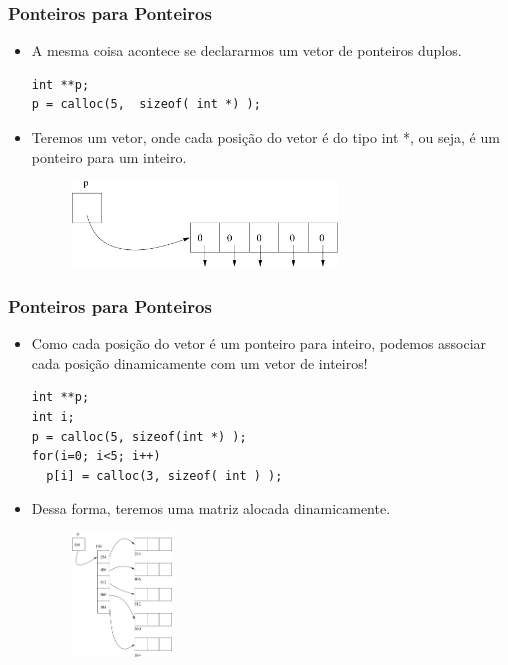 \documentclass[aspectratio=169]{beamer}
\begin{document}

\begin{frame}[fragile]
\frametitle{Ponteiros para Ponteiros}
\begin{itemize}
\item A mesma coisa acontece se declararmos um vetor de ponteiros duplos.
\begin{lstlisting}
int **p;
p = calloc(5,  sizeof( int *) );
\end{lstlisting}
\item Teremos um vetor, onde cada posição do vetor é do tipo int *, ou seja, é um ponteiro para um inteiro.
\begin{figure}[!ht]
  \centering
  \includegraphics[width=200pt]{imgs/vetor_de_ponteiros.png}
\end{figure}
\end{itemize}
\end{frame}


\begin{frame}[fragile]
\frametitle{Ponteiros para Ponteiros}
\begin{itemize}
\item Como cada posição do vetor é um ponteiro para inteiro, podemos
associar cada posição dinamicamente com um vetor de inteiros!
\begin{lstlisting}
int **p;
int i;
p = calloc(5, sizeof(int *) );
for(i=0; i<5; i++)
  p[i] = calloc(3, sizeof( int ) );
\end{lstlisting}
\item Dessa forma, teremos uma matriz alocada dinamicamente.
\begin{figure}[!ht]
  \centering
  \includegraphics[width=75pt]{imgs/matriz_dinamica.png}
\end{figure}
\end{itemize}
\end{frame}
\end{document}
